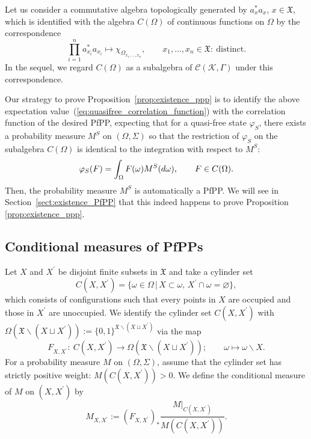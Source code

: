 \documentclass[11pt]{article}
\numberwithin{equation}{section}
\numberwithin{equation}{section}
\newcommand{\pr}[1]{#1^{\prime}}
\newcommand{\mfrak}[1]{\mathfrak{#1}}
\newcommand{\mcal}[1]{\mathcal{#1}}
\begin{document}
Let us consider a commutative algebra topologically generated by $a_{x}^{\ast}a_{x}$, $x\in\mfrak{X}$, which is identified with the algebra $C(\Omega)$ of continuous functions on $\Omega$ by the correspondence
\begin{equation*}
	\prod_{i=1}^{n}a_{x_{i}}^{\ast}a_{x_{i}}\mapsto \chi_{\Omega_{x_{1},\dots, x_{n}}},\qquad x_{1},\dots, x_{n}\in\mfrak{X}\colon \ \mbox{distinct.}
\end{equation*}
In the sequel, we regard $C(\Omega)$ as a subalgebra of $\mcal{C}(\mcal{K},\Gamma)$ under this correspondence.

Our strategy to prove Proposition~\ref{prop:existence_ppp} is to identify the above expectation value~(\ref{eq:quasifree_correlation_function}) with the correlation function of the desired PfPP, expecting that for a quasi-free state $\varphi_{S}$, there exists a probability measure $M^{S}$ on $(\Omega,\Sigma)$ so that the restriction of $\varphi_{S}$ on the subalgebra $C(\Omega)$ is identical to the integration with respect to $M^{S}$:
\begin{equation*}
	\varphi_{S}(F)=\int_{\Omega}F(\omega)M^{S}({\rm d}\omega),\qquad F\in C(\Omega).
\end{equation*}
Then, the probability measure $M^{S}$ is automatically a PfPP.
We will see in Section~\ref{sect:existence_PfPP} that this indeed happens to prove Proposition \ref{prop:existence_ppp}.


\setcounter{subsection}{5}\setcounter{Theorem}{14}\setcounter{equation}{7}
\subsection{Conditional measures of PfPPs}
Let $X$ and $\pr{X}$ be disjoint finite subsets in $\mfrak{X}$ and take a cylinder set
\begin{equation*}
	C(X,\pr{X})=\{\omega\in \Omega\,|\, X\subset \omega,\, \pr{X}\cap\omega=\varnothing\},
\end{equation*}
which consists of configurations such that every points in $X$ are occupied and those in $\pr{X}$ are unoccupied.
We identify the cylinder set $C(X,\pr{X})$ with $\Omega (\mfrak{X}\backslash (X\sqcup\pr{X})):=\{0,1\}^{\mfrak{X}\backslash (X\sqcup\pr{X})}$ via the map
\begin{equation*}
	F_{X,\pr{X}}\colon \ C(X,\pr{X})\to \Omega (\mfrak{X}\backslash (X\sqcup\pr{X}));\qquad \omega\mapsto \omega\backslash X.
\end{equation*}
For a probability measure $M$ on $(\Omega,\Sigma)$, assume that the cylinder set has strictly positive weight: $M(C(X,\pr{X}))>0$.
We define the conditional measure of $M$ on $(X,\pr{X})$ by
\begin{equation*}
	M_{X,\pr{X}}:=(F_{X,\pr{X}})_{\ast}\frac{M\big|_{C(X,\pr{X})}}{M(C(X,\pr{X}))}.
\end{equation*}
\end{document}
